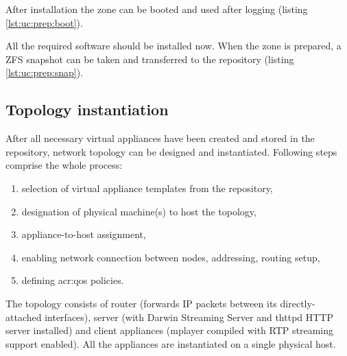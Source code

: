 \documentclass[11pt]{book}
\begin{document}
        \noindent
        After installation the zone can be booted and used after logging (listing \ref{lst:uc:prep:boot}). \\

        \noindent
        \begin{minipage}{\textwidth}
          
        \end{minipage}

        \noindent
        All the required software should be installed now. When the zone is prepared, a ZFS snapshot can be taken and
        transferred to the repository (listing \ref{lst:uc:prep:snap}). \\

        \noindent
        \begin{minipage}{\textwidth}
          
        \end{minipage}


      \subsection{Topology instantiation}
      \label{ssub:}

        After all necessary virtual appliances have been created and stored in the repository, network topology can be
        designed and instantiated. Following steps comprise the whole process:

        \begin{enumerate}
          \item selection of virtual appliance templates from the repository,
          \item designation of physical machine(s) to host the topology,
          \item appliance-to-host assignment,
          \item enabling network connection between nodes, addressing, routing setup,
          \item defining \gls{acr:qos} policies.
        \end{enumerate}

        The topology consists of router (forwards IP packets between its directly-attached interfaces), server (with
        Darwin Streaming Server and thttpd HTTP server installed) and client appliances (mplayer compiled with RTP
        streaming support enabled). All the appliances are instantiated on a single physical host.
\end{document}
